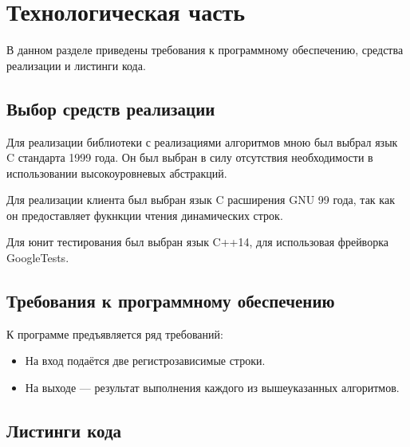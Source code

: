 \chapter{Технологическая часть}

    В данном разделе приведены требования к программному обеспечению, средства реализации и листинги кода.
    
    \section{Выбор средств реализации}
        
        Для реализации библиотеки с реализациями алгоритмов мною был выбрал язык C стандарта 1999 года. Он был выбран в силу отсутствия необходимости в использовании высокоуровневых абстракций.
        
        Для реализации клиента был выбран язык C расширения GNU 99 года, так как он предоставляет фукнкции чтения динамических строк.
        
        Для юнит тестирования был выбран язык C++14, для использовая фрейворка GoogleTests\cite{gtests}.
    
    \section{Требования к программному обеспечению}
    
        К программе предъявляется ряд требований:
        
        \begin{itemize}
            \item На вход подаётся две регистрозависимые строки.
            \item На выходе — результат выполнения каждого из вышеуказанных алгоритмов.
        \end{itemize}
    
    \clearpage
    
    \section{Листинги кода}
    
        
        
        \clearpage
        
        
        
